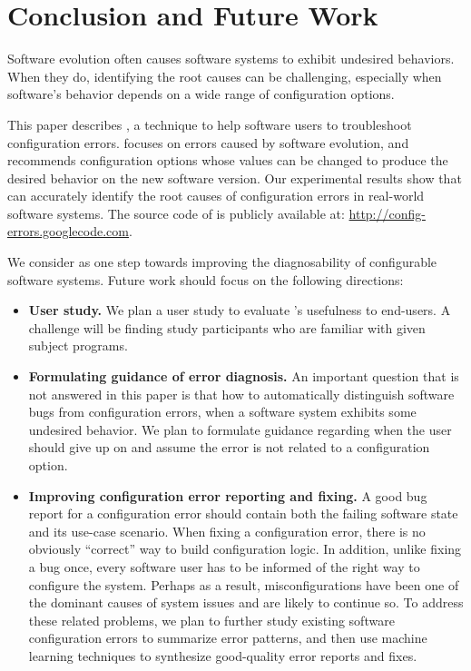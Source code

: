 \section{Conclusion and Future Work}
\label{sec:conclusion}

Software evolution often causes software systems to
exhibit undesired behaviors.
When they do, identifying the root causes
can be challenging, especially when software's
behavior depends on a wide range of configuration options.

This paper describes \ourtool, a technique to help software
users to troubleshoot configuration errors. \ourtool
focuses on errors caused by software evolution, and
recommends configuration options whose values can be changed to
produce the desired behavior on the new software version.
Our experimental results show that \ourtool
can accurately identify the root causes of
\errornum configuration errors in \subjnum real-world software systems.
The source code of \ourtool is publicly available
at: \url{http://config-errors.googlecode.com}.

We consider \ourtool as one step towards improving
the diagnosability of configurable software systems.
Future work should focus on the following directions:

\vspace{-2mm}

\begin{itemize}
\item \textbf{User study.} We plan a user study to evaluate
\ourtool's usefulness to end-users. A challenge
will be finding study participants who are familiar
with given subject programs.

\item \textbf{Formulating guidance of error diagnosis.}
An important question that is not answered in this paper
is that how to automatically distinguish software bugs from 
configuration errors, when a software system exhibits
some undesired behavior. We plan to formulate guidance
regarding when the user should give up on \ourtool
and assume the error is not related to a configuration option.

\item \textbf{Improving configuration error reporting and fixing.}
A good bug report for a configuration error should contain both the
failing software state and its use-case scenario.
When fixing a configuration error, there is no obviously ``correct'' way to
build configuration logic. In addition, unlike fixing a bug once,
every software user has to be informed of the right way to
configure the system. Perhaps as a result, misconfigurations
have been one of the dominant causes of system issues and
are likely to continue so. To address these related problems,
we plan to further study existing software configuration errors
to summarize error patterns, and then use machine learning
techniques to synthesize good-quality error reports and fixes.

\end{itemize}
